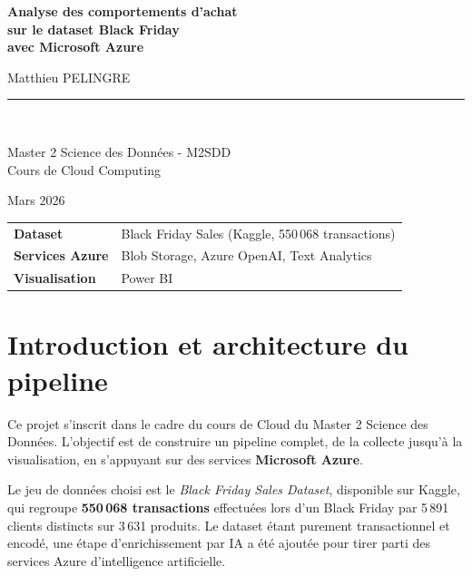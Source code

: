 \documentclass[12pt, a4paper]{article}
\begin{document}
\begin{titlepage}
  \centering
  \vspace*{2cm}
  {\Huge\bfseries\color{azureblue}
    Analyse des comportements d'achat\\[0.4em]
    sur le dataset Black Friday\\[0.4em]
    avec Microsoft Azure\par}
  \vspace{1.5cm}
  {\large Matthieu PELINGRE\par}
  \vspace{2cm}
  \rule{0.5\textwidth}{0.4pt}\\[1em]
  {\large Master 2 Science des Données - M2SDD\\
  Cours de Cloud Computing\par}
  \vspace{1cm}
  {\large Mars 2026\par}
  \vspace{2cm}
  \begin{tabular}{ll}
    \textbf{Dataset} & Black Friday Sales (Kaggle, 550\,068 transactions) \\[4pt]
    \textbf{Services Azure} & Blob Storage, Azure OpenAI, Text Analytics \\[4pt]
    \textbf{Visualisation} & Power BI \\
  \end{tabular}
\end{titlepage}

\section{Introduction et architecture du pipeline}

Ce projet s'inscrit dans le cadre du cours de Cloud du Master 2 Science des Données. L'objectif est de construire un pipeline complet, de la collecte jusqu'à la visualisation, en s'appuyant sur des services \textbf{Microsoft Azure}.

Le jeu de données choisi est le \textit{Black Friday Sales Dataset}, disponible sur Kaggle, qui regroupe \textbf{550\,068 transactions} effectuées lors d'un Black Friday par 5\,891 clients distincts sur 3\,631 produits. Le dataset étant purement transactionnel et encodé, une étape d'enrichissement par IA a été ajoutée pour tirer parti des services Azure d'intelligence artificielle.
\end{document}

